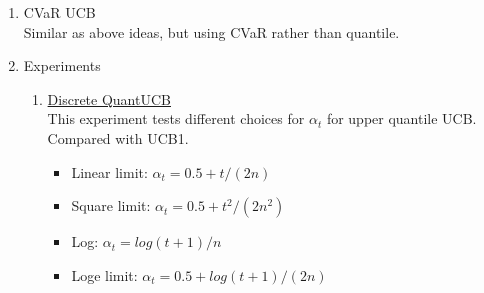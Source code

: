 \documentclass[11pt]{article}
\begin{document}
\begin{enumerate}
\begin{itemize}
\end{itemize}
\item CVaR UCB\\
Similar as above ideas, but using CVaR rather than quantile. 

\item Experiments

\begin{enumerate}
    \item  \href{https://github.com/chengsoonong/eheye/blob/master/QuantUCB/QuantUCB(Discrete).ipynb}{Discrete QuantUCB}\\
        This experiment tests different choices for $\alpha_t$ for upper quantile UCB.\\ 
        Compared with UCB1.
        
        \begin{itemize}
            \item    Linear limit: $\alpha_t = 0.5 + t/(2n)$    
            \item    Square limit: $\alpha_t = 0.5 + t^2/(2n^2)$    
            \item    Log: $\alpha_t = log(t + 1)/n$        
            \item    Loge limit: $\alpha_t = 0.5 + log(t + 1)/(2n)$
        \end{itemize}
        

\end{enumerate}
\end{enumerate}
\end{document}
